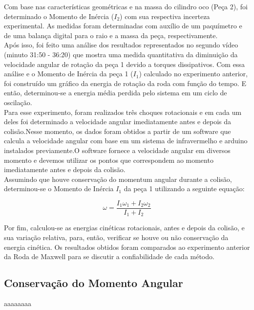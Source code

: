 Com base nas características geométricas e na massa do cilindro oco (Peça 2), foi determinado o Momento de Inércia ($I_2$) com sua respectiva incerteza experimental. As medidas foram determinadas com auxílio de um paquímetro e de uma balança digital para o raio e a massa da peça, respectivamente.\\

Após isso, foi feito uma análise dos resultados representados no segundo vídeo (minuto 31:50 - 36:20) que mostra uma medida quantitativa da diminuição da velocidade angular de rotação da peça 1 devido a torques dissipativos. Com essa análise e o Momento de Inércia da peça 1 ($I_1$) calculado no experimento anterior, foi construído um gráfico da energia de rotação da roda com função do tempo. E então, determinou-se a energia média perdida pelo sistema em um ciclo de oscilação.\\

Para esse experimento, foram realizados três choques rotacionais e em cada um deles foi determinado a velocidade angular imediatamente antes e depois da colisão.Nesse momento, os dados foram obtidos a partir de um software que calcula a velocidade angular com base em um sistema de infravermelho e arduino instalados previamente.O software fornece a velocidade angular em diversos momento e devemos utilizar os pontos que correspondem ao momento imediatamente antes e depois da colisão.\\

Assumindo que houve conservação do momentum angular durante a colisão, determinou-se o Momento de Inércia $I_1$ da peça 1 utilizando a seguinte equação:

\[ \omega = \frac{I_1 \omega_1+I_2 \omega_2}{I_1+I_2} \]

Por fim, calculou-se as energias cinéticas rotacionais, antes e depois da colisão, e sua variação relativa, para, então, verificar se houve ou não conservação da energia cinética. Os resultados obtidos foram comparados ao experimento anterior da Roda de Maxwell para se discutir a confiabilidade de cada método.



\subsection{Conservação do Momento Angular}

aaaaaaaa


